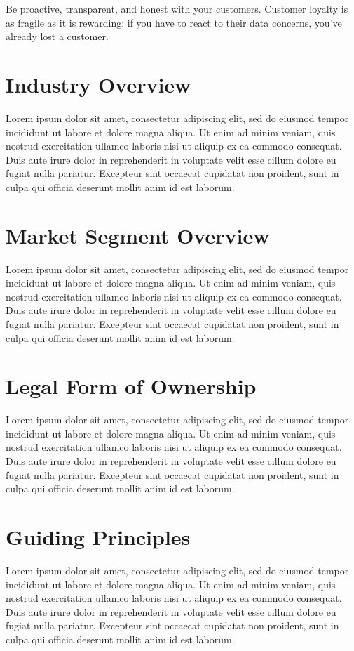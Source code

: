 Be proactive, transparent, and honest with your customers. Customer loyalty is as fragile as it is rewarding: if you have to react to their data concerns, you've already lost a customer.


\section{Industry Overview}

Lorem ipsum dolor sit amet, consectetur adipiscing elit, sed do eiusmod tempor incididunt ut labore et dolore magna aliqua. Ut enim ad minim veniam, quis nostrud exercitation ullamco laboris nisi ut aliquip ex ea commodo consequat. Duis aute irure dolor in reprehenderit in voluptate velit esse cillum dolore eu fugiat nulla pariatur. Excepteur sint occaecat cupidatat non proident, sunt in culpa qui officia deserunt mollit anim id est laborum.


\section{Market Segment Overview}

Lorem ipsum dolor sit amet, consectetur adipiscing elit, sed do eiusmod tempor incididunt ut labore et dolore magna aliqua. Ut enim ad minim veniam, quis nostrud exercitation ullamco laboris nisi ut aliquip ex ea commodo consequat. Duis aute irure dolor in reprehenderit in voluptate velit esse cillum dolore eu fugiat nulla pariatur. Excepteur sint occaecat cupidatat non proident, sunt in culpa qui officia deserunt mollit anim id est laborum.


\section{Legal Form of Ownership}

Lorem ipsum dolor sit amet, consectetur adipiscing elit, sed do eiusmod tempor incididunt ut labore et dolore magna aliqua. Ut enim ad minim veniam, quis nostrud exercitation ullamco laboris nisi ut aliquip ex ea commodo consequat. Duis aute irure dolor in reprehenderit in voluptate velit esse cillum dolore eu fugiat nulla pariatur. Excepteur sint occaecat cupidatat non proident, sunt in culpa qui officia deserunt mollit anim id est laborum.


\section{Guiding Principles}

Lorem ipsum dolor sit amet, consectetur adipiscing elit, sed do eiusmod tempor incididunt ut labore et dolore magna aliqua. Ut enim ad minim veniam, quis nostrud exercitation ullamco laboris nisi ut aliquip ex ea commodo consequat. Duis aute irure dolor in reprehenderit in voluptate velit esse cillum dolore eu fugiat nulla pariatur. Excepteur sint occaecat cupidatat non proident, sunt in culpa qui officia deserunt mollit anim id est laborum.
